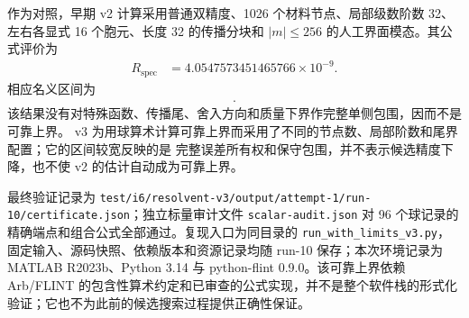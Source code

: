 作为对照，早期 v2 计算采用普通双精度、1026 个材料节点、局部级数阶数 32、左右各显式
16 个胞元、长度 32 的传播分块和 $|m|\leq256$ 的人工界面模态。其公式评价为
\begin{align*}
  R_{\mathrm{spec}}
  &=4.0547573451465766\times10^{-9}.
\end{align*}
相应名义区间为
\begin{align*}
  [3.3590469285828397,\;3.3590469366923545].
\end{align*}
该结果没有对特殊函数、传播尾、舍入方向和质量下界作完整单侧包围，因而不是可靠上界。
v3 为用球算术计算可靠上界而采用了不同的节点数、局部阶数和尾界配置；它的区间较宽反映的是
完整误差所有权和保守包围，并不表示候选精度下降，也不使 v2 的估计自动成为可靠上界。

最终验证记录为
\texttt{test/i6/resolvent-v3/output/attempt-1/run-10/certificate.json}；独立标量审计文件
\texttt{scalar-audit.json} 对 96 个球记录的精确端点和组合公式全部通过。复现入口为同目录的
\texttt{run\_with\_limits\_v3.py}，固定输入、源码快照、依赖版本和资源记录均随 run-10
保存；本次环境记录为 MATLAB R2023b、Python 3.14 与 python-flint 0.9.0。该可靠上界依赖
Arb/FLINT 的包含性算术约定和已审查的公式实现，并不是整个软件栈的形式化
验证；它也不为此前的候选搜索过程提供正确性保证。
